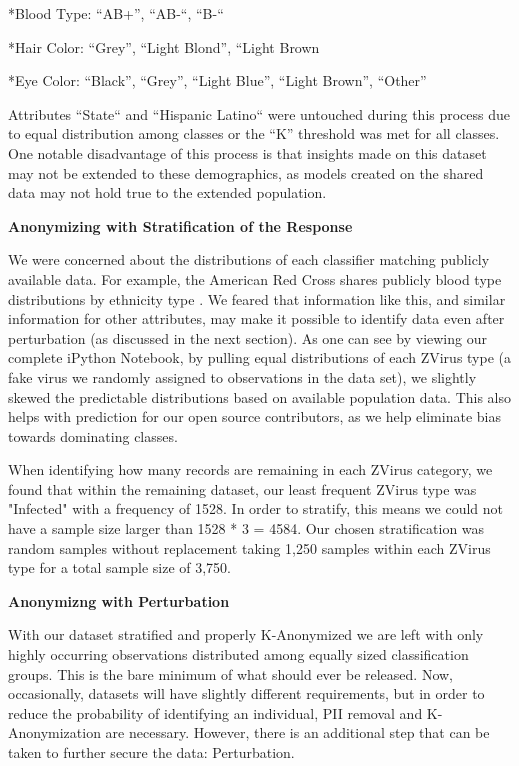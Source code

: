 \documentclass[10pt,journal,compsoc]{IEEEtran}
\begin{document}
		*Blood Type: “AB+”, “AB-“, “B-“ 
		
		*Hair Color: “Grey”, “Light Blond”, “Light Brown
		
		*Eye Color: “Black”, “Grey”, “Light Blue”, “Light Brown”, “Other”

Attributes ``State`` and ``Hispanic Latino`` were untouched during this process due to equal distribution among classes or the “K” threshold was met for all classes.  One notable disadvantage of this process is that insights made on this dataset may not be extended to these demographics, as models created on the shared data may not hold true to the extended population.\linebreak

\noindent \textbf{ Anonymizing with Stratification of the Response}

We were concerned about the distributions of each classifier matching publicly available data. For example, the American Red Cross shares publicly blood type distributions by ethnicity type . We feared that information like this, and similar information for other attributes, may make it possible to identify data even after perturbation (as discussed in the next section). As one can see by viewing our complete iPython Notebook, by pulling equal distributions of each ZVirus type (a fake virus we randomly assigned to observations in the data set), we slightly skewed the predictable distributions based on available population data. This also helps with prediction for our open source contributors, as we help eliminate bias towards dominating classes.

When identifying how many records are remaining in each ZVirus category, we found that within the remaining dataset, our least frequent ZVirus type was "Infected" with a frequency of 1528. In order to stratify, this means we could not have a sample size larger than 1528 * 3 = 4584. Our chosen stratification was random samples without replacement taking 1,250 samples within each ZVirus type for a total sample size of 3,750.\linebreak

\noindent \textbf{Anonymizng with Perturbation}

With our dataset stratified and properly K-Anonymized we are left with only highly occurring observations distributed among equally sized classification groups. This is the bare minimum of what should ever be released. Now, occasionally,  datasets will have slightly different requirements, but in order to reduce the probability of identifying an individual, PII removal and K-Anonymization are necessary.  However, there is an additional step that can be taken to further secure the data: Perturbation.
\end{document}

